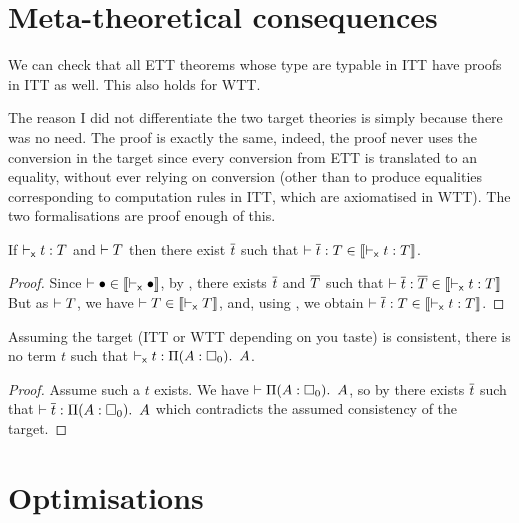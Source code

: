 \section{Meta-theoretical consequences}

We can check that all \acrshort{ETT} theorems whose type are typable in
\acrshort{ITT} have proofs in \acrshort{ITT} as well.
This also holds for \acrshort{WTT}.

The reason I did not differentiate the two target theories is simply because
there was no need. The proof is exactly the same, indeed, the proof never uses
the conversion in the target since every conversion from \acrshort{ETT} is
translated to an equality, without ever relying on conversion (other than to
produce equalities corresponding to computation rules in \acrshort{ITT}, which
are axiomatised in \acrshort{WTT}).
The two formalisations are proof enough of this.

\begin{corollary}[Conservativity]
  If $\vdash_{\mathsf{x}} t : T$ and $\vdash T$ then there exist $\overline{t}$ such that
    $\vdash \overline{t} : T \in \llbracket \vdash_{\mathsf{x}} t : T \rrbracket$.
\end{corollary}

\begin{proof}
  Since $\vdash \bullet \in \llbracket \vdash_{\mathsf{x}} \bullet \rrbracket$, by
  , there exists $\overline{t}$ and $\overline{T}$ such that
  $\vdash \overline{t} : \overline{T} \in \llbracket \vdash_{\mathsf{x}} t : T \rrbracket$
  But as $\vdash T$, we have
  $\vdash T \in \llbracket \vdash_{\mathsf{x}} T \rrbracket$, and,
  using , we obtain
  $\vdash \overline{t} : T \in \llbracket \vdash_{\mathsf{x}} t : T \rrbracket$.
\end{proof}

\begin{corollary}
  Assuming the target (\acrshort{ITT} or \acrshort{WTT} depending on you taste)
  is consistent, there is no term $t$ such that
  $\vdash_{\mathsf{x}} t : \mathop{\Pi(A:\square_{0}).\ }{A}$.
\end{corollary}

\begin{proof}
  Assume such a $t$ exists.
  We have $\vdash \mathop{\Pi(A:\square_{0}).\ }{A}$, so by 
  there exists $\overline{t}$ such that $\vdash \overline{t} : \mathop{\Pi(A:\square_{0}).\ }{A}$ which
  contradicts the assumed consistency of the target.
\end{proof}

\section{Optimisations}

